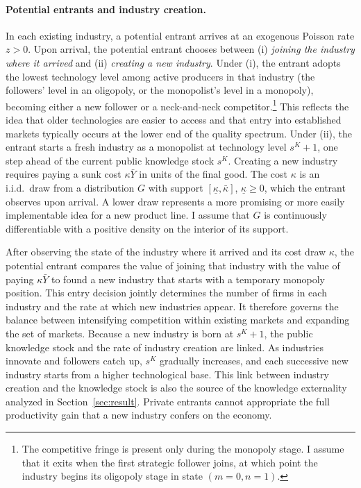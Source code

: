 \documentclass[12pt]{article}
\begin{document}
\paragraph{Potential entrants and industry creation.}

In each existing industry, a potential entrant arrives at an exogenous Poisson rate \(z > 0\). Upon arrival, the potential entrant chooses between (i) \emph{joining the industry where it arrived} and (ii) \emph{creating a new industry}. Under (i), the entrant adopts the lowest technology level among active producers in that industry (the followers' level in an oligopoly, or the monopolist's level in a monopoly), becoming either a new follower or a neck-and-neck competitor.\footnote{The competitive fringe is present only during the monopoly stage. I assume that it exits when the first strategic follower joins, at which point the industry begins its oligopoly stage in state \((m=0,n=1)\).} This reflects the idea that older technologies are easier to access and that entry into established markets typically occurs at the lower end of the quality spectrum. Under (ii), the entrant starts a fresh industry as a monopolist at technology level \(s^K + 1\), one step ahead of the current public knowledge stock \(s^K\). Creating a new industry requires paying a sunk cost \(\kappa \bar{Y}\) in units of the final good. The cost \(\kappa\) is an i.i.d.\ draw from a distribution \(G\) with support \([\underline{\kappa}, \bar{\kappa}]\), \(\underline{\kappa} \geq 0\), which the entrant observes upon arrival. A lower draw represents a more promising or more easily implementable idea for a new product line. I assume that \(G\) is continuously differentiable with a positive density on the interior of its support.

After observing the state of the industry where it arrived and its cost draw \(\kappa\), the potential entrant compares the value of joining that industry with the value of paying \(\kappa\bar Y\) to found a new industry that starts with a temporary monopoly position. This entry decision jointly determines the number of firms in each industry and the rate at which new industries appear. It therefore governs the balance between intensifying competition within existing markets and expanding the set of markets. Because a new industry is born at \(s^K+1\), the public knowledge stock and the rate of industry creation are linked. As industries innovate and followers catch up, \(s^K\) gradually increases, and each successive new industry starts from a higher technological base. This link between industry creation and the knowledge stock is also the source of the knowledge externality analyzed in Section~\ref{sec:result}. Private entrants cannot appropriate the full productivity gain that a new industry confers on the economy.
\end{document}
